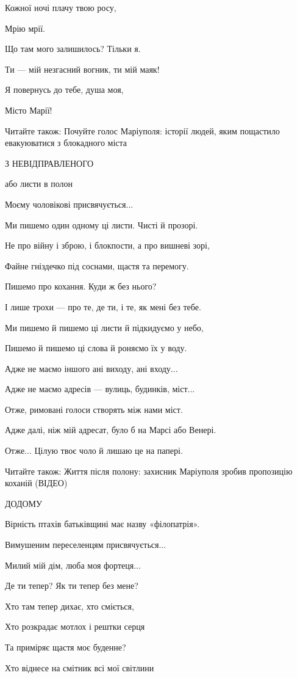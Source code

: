 Кожної ночі плачу твою росу,

Мрію мрії.

Що там мого залишилось? Тільки я.

Ти — мій незгасний вогник, ти мій маяк!

Я повернусь до тебе, душа моя,

Місто Марії!

Читайте також: Почуйте голос Маріуполя: історії людей, яким пощастило евакуюватися з блокадного міста


З НЕВІДПРАВЛЕНОГО

або листи в полон

Моєму чоловікові присвячується...

Ми пишемо один одному ці листи. Чисті й прозорі.

Не про війну і зброю, і блокпости, а про вишневі зорі,

Файне гніздечко під соснами, щастя та перемогу.

Пишемо про кохання. Куди ж без нього?

І лише трохи — про те, де ти, і те, як мені без тебе.

Ми пишемо й пишемо ці листи й підкидуємо у небо,

Пишемо й пишемо ці слова й роняємо їх у воду.

Адже не маємо іншого ані виходу, ані входу...

Адже не маємо адресів — вулиць, будинків, міст...

Отже, римовані голоси створять між нами міст.

Адже далі, ніж мій адресат, було б на Марсі або Венері.

Отже... Цілую твоє чоло й лишаю це на папері.

Читайте також: Життя після полону: захисник Маріуполя зробив пропозицію коханій (ВІДЕО)

ДОДОМУ

Вірність птахів батьківщині має назву «філопатрія».

Вимушеним переселенцям присвячується...

Милий мій дім, люба моя фортеця...

Де ти тепер? Як ти тепер без мене?

Хто там тепер дихає, хто сміється,

Хто розкрадає мотлох і рештки серця

Та приміряє щастя моє буденне?

Хто віднесе на смітник всі мої світлини

